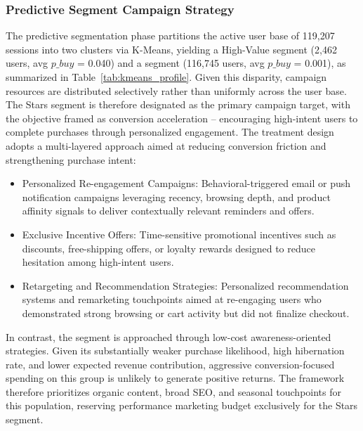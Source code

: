 \documentclass[conference]{IEEEtran}
\begin{document}
\subsubsection{Predictive Segment Campaign Strategy}

The predictive segmentation phase partitions the active user 
base of 119,207 sessions into two clusters via K-Means, 
yielding a High-Value  segment (2,462 users, 
avg $p\_buy$ = 0.040) and a  segment 
(116,745 users, avg $p\_buy$ = 0.001), as summarized in 
Table~\ref{tab:kmeans_profile}. Given this disparity, campaign 
resources are distributed selectively rather than uniformly 
across the user base. The Stars segment is therefore 
designated as the primary campaign target, with the objective 
framed as conversion acceleration -- encouraging 
high-intent users to complete purchases through personalized 
engagement. The treatment design adopts a multi-layered 
approach aimed at reducing conversion friction and 
strengthening purchase intent:

\begin{itemize}
    \item Personalized Re-engagement Campaigns:
    Behavioral-triggered email or push notification campaigns
    leveraging recency, browsing depth, and product affinity
    signals to deliver contextually relevant reminders and
    offers.

    \item Exclusive Incentive Offers:
    Time-sensitive promotional incentives such as discounts,
    free-shipping offers, or loyalty rewards designed to
    reduce hesitation among high-intent users.

    \item Retargeting and Recommendation Strategies:
    Personalized recommendation systems and remarketing
    touchpoints aimed at re-engaging users who demonstrated
    strong browsing or cart activity but did not finalize
    checkout.
\end{itemize}

In contrast, the  segment is approached 
through low-cost awareness-oriented strategies. Given its 
substantially weaker purchase likelihood, high hibernation 
rate, and lower expected revenue contribution, aggressive 
conversion-focused spending on this group is unlikely to 
generate positive returns. The framework therefore prioritizes 
organic content, broad SEO, and seasonal touchpoints for this 
population, reserving performance marketing budget exclusively 
for the Stars segment.
\end{document}
